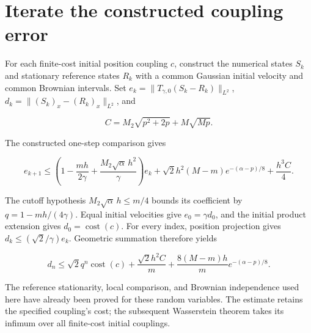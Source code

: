 \documentclass[11pt,a4paper]{article}
\begin{document}
\section{\texorpdfstring{Iterate the constructed coupling error}{Iterate the constructed coupling error}}


For each finite-cost initial position coupling \(c\), construct the numerical states \(S_k\) and stationary reference states \(R_k\) with a common Gaussian initial velocity and common Brownian intervals. Set \(e_k=\|T_{\gamma,0}(S_k-R_k)\|_{L^2}\), \(d_k=\|(S_k)_x-(R_k)_x\|_{L^2}\), and

\[C=M_2\sqrt{p^2+2p}+M\sqrt{Mp}.\]

The constructed one-step comparison gives

\[e_{k+1}\le\left(1-\frac{mh}{2\gamma}+\frac{M_2\sqrt\alpha\,h^2}{\gamma}\right)e_k+\sqrt2h^2(M-m)e^{-(\alpha-p)/8}+\frac{h^3C}{4}.\]

The cutoff hypothesis \(M_2\sqrt\alpha\,h\le m/4\) bounds its coefficient by \(q=1-mh/(4\gamma)\). Equal initial velocities give \(e_0=\gamma d_0\), and the initial product extension gives \(d_0=\operatorname{cost}(c)\). For every index, position projection gives \(d_k\le(\sqrt2/\gamma)e_k\). Geometric summation therefore yields

\[d_n\le\sqrt2q^n\operatorname{cost}(c)+\frac{\sqrt2h^2C}{m}+\frac{8(M-m)h}{m}e^{-(\alpha-p)/8}.\]

The reference stationarity, local comparison, and Brownian independence used here have already been proved for these random variables. The estimate retains the specified coupling's cost; the subsequent Wasserstein theorem takes its infimum over all finite-cost initial couplings.
\end{document}
